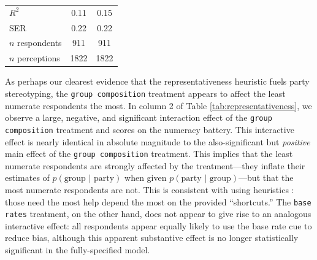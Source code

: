 \documentclass[12pt, letterpaper]{article}
\begin{document}
\begin{table}[]
\begin{center}
\begin{tabular}{l|cc|}
\multicolumn{1}{|l|}{$R^{2}$}     & 0.11                            & 0.15                            \\
\multicolumn{1}{|l|}{SER}                         & 0.22                            & 0.22                            \\
\multicolumn{1}{|l|}{$n$ respondents}             & 911                             & 911                             \\
\multicolumn{1}{|l|}{$n$ perceptions}             & 1822                            & 1822                            \\ \hline
\end{tabular}
\end{center}
\end{table}

As perhaps our clearest evidence that the representativeness heuristic fuels party stereotyping, the {\tt group composition} treatment appears to affect the least numerate respondents the most. In column 2 of Table \ref{tab:representativeness}, we observe a large, negative, and significant interaction effect of the {\tt group composition} treatment and scores on the numeracy battery. This interactive effect is nearly identical in absolute magnitude to the also-significant but \emph{positive} main effect of the {\tt group composition} treatment. This implies that the least numerate respondents are strongly affected by the treatment---they inflate their estimates of $p(\text{group | party})$ when given $p(\text{party | group})$---but that the most numerate respondents are not. This is consistent with using heuristics \citep{kahneman1972subjective}: those need the most help depend the most on the provided ``shortcuts.'' The {\tt base rates} treatment, on the other hand, does not appear to give rise to an analogous interactive effect: all respondents appear equally likely to use the base rate cue to reduce bias, although this apparent substantive effect is no longer statistically significant in the fully-specified model.
\end{document}
